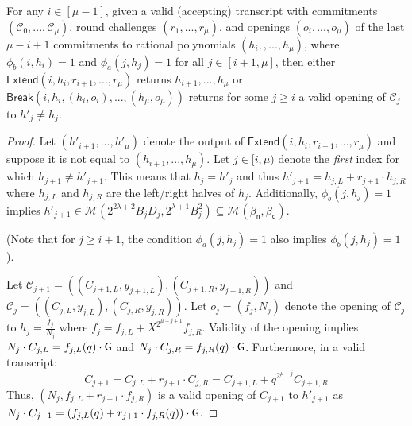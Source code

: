 \begin{subclaim} 
 For any $i \in [\mu-1]$, given a valid (accepting) transcript with commitments $(\mathcal{C}_0,...,\mathcal{C}_\mu)$, round challenges $(r_1,...,r_\mu)$, and openings $(o_i,...,o_\mu)$ of the last $\mu-i + 1$ commitments to rational polynomials $(h_i,,...,h_\mu)$, where $\phi_b(i, h_i) = 1$ and $\phi_a(j, h_j) = 1$ for all $j \in [i+1,\mu]$, then either $\textsf{Extend}(i, h_i, r_{i+1},...,r_\mu)$ returns $h_{i+1},...,h_{\mu}$ or $\textsf{Break}(i, h_i, (h_i, o_i),...,(h_\mu, o_\mu))$ returns for some $j \geq i$ a valid opening of $\mathcal{C}_j$ to $h'_j \neq h_j$.  %
\end{subclaim} 
\begin{proof} 
Let $(h'_{i+1},...,h'_\mu)$ denote the output of $\textsf{Extend}(i, h_i, r_{i+1},...,r_\mu)$ and suppose it is not equal to $(h_{i+1},..., h_\mu)$. Let $j \in [i, \mu)$ denote the \emph{first} index for which $h_{j+1} \neq h'_{j+1}$. This means that $h_j = h'_j$ and thus $h'_{j+1} = h_{j, L} + r_{j+1} \cdot h_{j, R}$ where $h_{j, L}$ and $h_{j, R}$ are the left/right halves of $h_{j}$. Additionally, $\phi_b(j, h_{j}) = 1$ implies $h'_{j+1} \in \mathcal{M}(2^{2\lambda + 2} B_{j}D_j, 2^{\lambda + 1} B_{j}^2) \subseteq \mathcal{M}(\beta_\textsf{n}, \beta_\textsf{d})$. 

(Note that for $j \geq i+1$, the condition $\phi_a(j, h_j) = 1$ also implies $\phi_b(j, h_j) = 1$).

Let $\mathcal{C}_{j+1} = ((C_{j+1, L}, y_{j+1,L}), (C_{j+1,R}, y_{j+1,R}))$ and $\mathcal{C}_{j} = ((C_{j,L}, y_{j,L}), (C_{j,R},y_{j,R}))$. 
Let $o_j = (f_j, N_{j})$ denote the opening of $\mathcal{C}_{j}$ to $h_j =\frac{f_j}{N_{j}}$ where $f_{j} = f_{j, L} + X^{2^{\mu - j + 1}} f_{j, R}$. Validity of the opening implies $N_{j} \cdot C_{j,L} = f_{j,L}(q) \cdot \gr{G}$ and $N_{j} \cdot C_{j,R} = f_{j,R}(q) \cdot \gr{G}$. Furthermore, in a valid transcript: 
 $$C_{j+1}  = C_{j, L} + r_{j+1} \cdot C_{j,R} =  C_{j+1,L} + q^{2^{\mu - j}} C_{j+1,R}$$
  Thus, $(N_{j}, f_{j,L} + r_{j+1} \cdot f_{j, R})$ is a valid opening of $C_{j+1}$ to $h'_{j+1}$ as $N_{j} \cdot C_{j+1} = (f_{j, L}(q) + r_{j+1} \cdot f_{j, R}(q)) \cdot \gr{G}$. 

\end{proof} 


